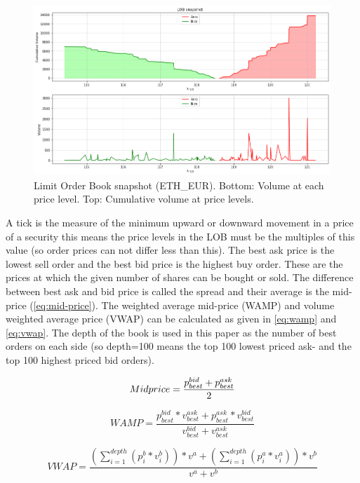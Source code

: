 \documentclass[11pt,a4paper,oneside]{article}
\begin{document}
  \begin{figure}[tbh]
    \centering
    \includegraphics[width=\textwidth]{lob_snapshot.png}
    \caption{Limit Order Book snapshot (ETH\_EUR). Bottom: Volume at each price level. Top: Cumulative volume at price levels.}
    \label{fig:1}
  \end{figure}

  A tick is the measure of the minimum upward or downward movement in a price of a security this means the price levels 
  in the LOB must be the multiples of this value (so order prices can not differ less than this). The best ask price is 
  the lowest sell order and the best bid price is the highest buy order. These are the prices at which the given number 
  of shares can be bought or sold. The difference between best ask and bid price is called the spread and their average 
  is the mid-price (\ref{eq:mid-price}). The weighted average mid-price (WAMP) and volume weighted average price (VWAP) 
  can be calculated as given in \autoref{eq:wamp} and \autoref{eq:vwap}. The depth of the book is used in this paper as 
  the number of best orders on each side (so depth=100 means the top 100 lowest priced ask- and the top 100 highest 
  priced bid orders).

  \begin{equation}
    Mid\-price = \frac{p_{best}^{bid} + p_{best}^{ask}}{2}
    \label{eq:mid-price}
  \end{equation}

  \begin{equation}
    WAMP = \frac{p_{best}^{bid} * v_{best}^{ask} + p_{best}^{ask} * v_{best}^{bid}}{v_{best}^{bid} + v_{best}^{ask}}
    \label{eq:wamp}
  \end{equation}

  \begin{equation}
    VWAP = \frac{(\sum_{i=1}^{depth} (p_i^b * v_i^b))*v^a + (\sum_{i=1}^{depth} (p_i^a * v_i^a))*v^b}{v^a + v^b}
    \label{eq:vwap}
  \end{equation}
\end{document}
